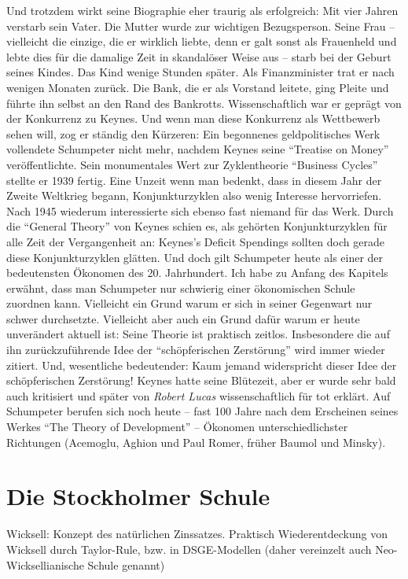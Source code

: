 Und trotzdem wirkt seine Biographie eher traurig als erfolgreich: Mit vier Jahren verstarb sein Vater. Die Mutter wurde zur wichtigen Bezugsperson. Seine Frau -- vielleicht die einzige, die er wirklich liebte, denn er galt sonst als Frauenheld und lebte dies für die damalige Zeit in skandalöser Weise aus -- starb bei der Geburt seines Kindes. Das Kind wenige Stunden später. 
Als Finanzminister trat er nach wenigen Monaten zurück. Die Bank, die er als Vorstand leitete, ging Pleite und führte ihn selbst an den Rand des Bankrotts. Wissenschaftlich war er geprägt von der Konkurrenz zu Keynes. Und wenn man diese Konkurrenz als Wettbewerb sehen will, zog er ständig den Kürzeren: Ein begonnenes geldpolitisches Werk vollendete Schumpeter nicht mehr, nachdem Keynes seine "`Treatise on Money"' veröffentlichte. Sein monumentales Wert zur Zyklentheorie "`Business Cycles"' stellte er 1939 fertig. Eine Unzeit wenn man bedenkt, dass in diesem Jahr der Zweite Weltkrieg begann, Konjunkturzyklen also wenig Interesse hervorriefen. Nach 1945 wiederum interessierte sich ebenso fast niemand für das Werk. Durch die "`General Theory"' von Keynes schien es, als gehörten Konjunkturzyklen für alle Zeit der Vergangenheit an: Keynes's Deficit Spendings sollten doch gerade diese Konjunkturzyklen glätten.
Und doch gilt Schumpeter heute als einer der bedeutensten Ökonomen des 20. Jahrhundert. Ich habe zu Anfang des Kapitels erwähnt, dass man Schumpeter nur schwierig einer ökonomischen Schule zuordnen kann. Vielleicht ein Grund warum er sich in seiner Gegenwart nur schwer durchsetzte. Vielleicht aber auch ein Grund dafür warum er heute unverändert aktuell ist: Seine Theorie ist praktisch zeitlos. Insbesondere die auf ihn zurückzuführende Idee der "`schöpferischen Zerstörung"' wird immer wieder zitiert. Und, wesentliche bedeutender: Kaum jemand widerspricht dieser Idee der schöpferischen Zerstörung! Keynes hatte seine Blütezeit, aber er wurde sehr bald auch kritisiert und später von \textit{Robert Lucas} wissenschaftlich für tot erklärt. Auf Schumpeter berufen sich noch heute -- fast 100 Jahre nach dem Erscheinen seines Werkes "`The Theory of Development"' -- Ökonomen unterschiedlichster Richtungen (Acemoglu, Aghion und Paul Romer, früher Baumol und Minsky).



\section{Die Stockholmer Schule}
Wicksell: Konzept des natürlichen Zinssatzes. Praktisch Wiederentdeckung von Wicksell durch Taylor-Rule, bzw. in DSGE-Modellen (daher vereinzelt auch Neo-Wicksellianische Schule genannt)
